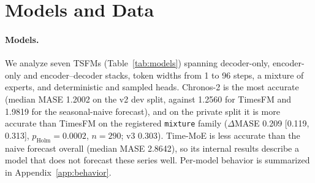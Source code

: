 \section{Models and Data}
\label{sec:setup}

\paragraph{Models.} We analyze seven TSFMs (Table~\ref{tab:models}) spanning decoder-only, encoder-only and
encoder--decoder stacks, token widths from 1 to 96 steps, a mixture of experts, and deterministic and sampled heads.
Chronos-2 is the most accurate (median MASE 1.2002 on the v2 dev split, against 1.2560 for TimesFM and 1.9819 for the
seasonal-naive forecast), and on the private split it is more accurate than TimesFM on the registered \texttt{mixture}
family ($\Delta$MASE 0.209 [0.119, 0.313], $p_{\text{Holm}}=0.0002$, $n=290$; v3 0.303). Time-MoE is less accurate
than the naive forecast overall (median MASE 2.8642), so its internal results describe a model that does not forecast
these series well. Per-model behavior is summarized in Appendix~\ref{app:behavior}.

\begin{table}[!tb]
\centering
\footnotesize
\setlength{\tabcolsep}{4pt}
\caption{The seven models. ``Token'' is time steps per token; median MASE is on the v2 dev split (965 series;
seasonal naive 1.9819); ``FLOPs obs.''\ is the share of a forecast's FLOPs spent in captured blocks at context 480.
$^{a}$Encoder only; the sampled decoder is not captured ().}
\label{tab:models}
\end{table}


